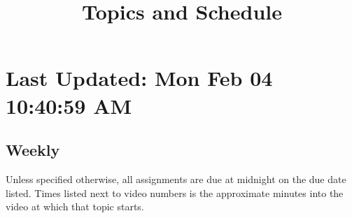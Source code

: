 \documentclass[]{article}
\title{Topics and Schedule}
\author{}
\date{}
\begin{document}
\maketitle

\section{Last Updated: Mon Feb 04 10:40:59
AM}\label{last-updated-mon-feb-04-104059-am}

\subsection{Weekly}\label{weekly}

 Unless specified otherwise, all assignments are due at midnight on the
due date listed. Times listed next to video numbers is the approximate
minutes into the video at which that topic starts.
\end{document}

